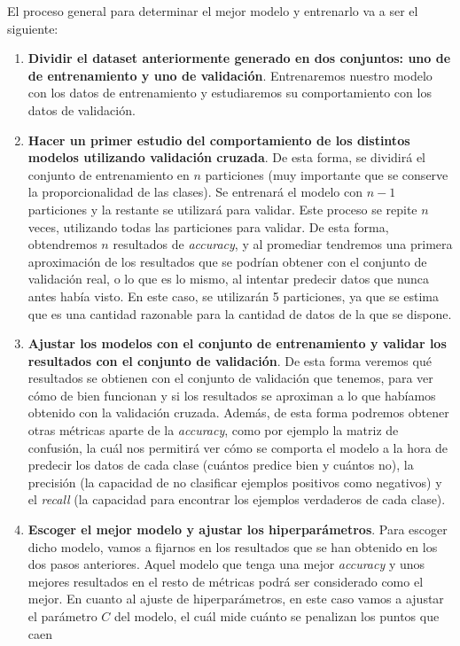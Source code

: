 \documentclass[11pt,a4paper]{article}
\begin{document}
El proceso general para determinar el mejor modelo y entrenarlo va a ser el siguiente:

\begin{enumerate}
	\item \textbf{Dividir el dataset anteriormente generado en dos conjuntos: uno de de entrenamiento
	y uno de validación}. Entrenaremos nuestro modelo con los datos de entrenamiento y estudiaremos
	su comportamiento con los datos de validación.
	\item\textbf{Hacer un primer estudio del comportamiento de los distintos modelos utilizando validación
	cruzada}. De esta forma, se dividirá el conjunto de entrenamiento en
	$n$ particiones (muy importante que se conserve la proporcionalidad de las clases). Se entrenará
	el modelo con $n-1$ particiones y la restante se utilizará para validar. Este proceso se
	repite $n$ veces, utilizando todas las particiones para validar. De esta forma, obtendremos
	$n$ resultados de \textit{accuracy}, y al promediar tendremos una primera aproximación
	de los resultados que se podrían obtener con el conjunto de validación real, o lo que es
	lo mismo, al intentar predecir datos que nunca antes había visto. En este caso, se utilizarán
	5 particiones, ya que se estima que es una cantidad razonable para la cantidad de datos de la
	que se dispone.
	\item \textbf{Ajustar los modelos con el conjunto de entrenamiento y validar los resultados con el
	conjunto de validación}. De esta forma veremos qué resultados se obtienen con el conjunto
	de validación que tenemos, para ver cómo de bien funcionan y si los resultados se aproximan
	a lo que habíamos obtenido con la validación cruzada. Además, de esta forma podremos obtener
	otras métricas aparte de la \textit{accuracy}, como por ejemplo la matriz de confusión, la cuál
	nos permitirá ver cómo se comporta el modelo a la hora de predecir los datos de cada clase (cuántos
	predice bien y cuántos no), la precisión (la capacidad de no clasificar ejemplos positivos como
	negativos) y el \textit{recall} (la capacidad para encontrar los ejemplos verdaderos de cada clase).
	\item \textbf{Escoger el mejor modelo y ajustar los hiperparámetros}. Para escoger dicho modelo, vamos
	a fijarnos en los resultados que se han obtenido en los dos pasos anteriores. Aquel modelo
	que tenga una mejor \textit{accuracy} y unos mejores resultados en el resto de métricas podrá
	ser considerado como el mejor. En cuanto al ajuste de hiperparámetros, en este caso vamos
	a ajustar el parámetro $C$ del modelo, el cuál mide cuánto se penalizan los puntos que caen

\end{enumerate}
\end{document}
